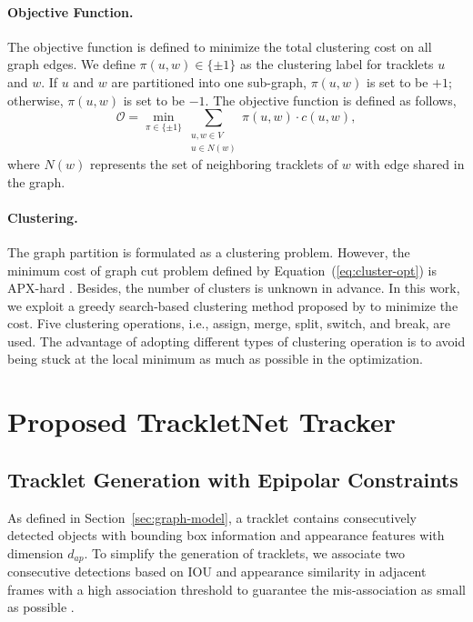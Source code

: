 \documentclass[10pt,twocolumn,letterpaper]{article}
\begin{document}
\paragraph{Objective Function.} 
The objective function is defined to minimize the total clustering cost on all graph edges. We define $\pi(u,w)\in\{\pm 1\}$ as the clustering label for tracklets $u$ and $w$. If $u$ and $w$ are partitioned into one sub-graph, $\pi(u,w)$ is set to be $+1$; otherwise, $\pi(u,w)$ is set to be $-1$. The objective function is defined as follows,
\begin{equation}
\mathcal{O} = \min_{\pi \in \{\pm 1\}}\sum_{\substack{u,w \in V\\u \in N(w)}} \pi(u,w) \cdot c(u,w),
\label{eq:cluster-opt}
\end{equation}
where $N(w)$ represents the set of neighboring tracklets of $w$ with edge shared in the graph.

\paragraph{Clustering.} 
The graph partition is formulated as a clustering problem. However, the minimum cost of graph cut problem defined by Equation~(\ref{eq:cluster-opt}) is APX-hard \cite{papadimitriou1991optimization}. 
Besides, the number of clusters is unknown in advance. 
In this work, we exploit a greedy search-based clustering method proposed by \cite{tang2018single} to minimize the cost. Five clustering operations, i.e., assign, merge, split, switch, and break, are used. The advantage of adopting different types of clustering operation is to avoid being stuck at the local minimum as much as possible in the optimization. 


\section{Proposed TrackletNet Tracker} 


\subsection{Tracklet Generation with Epipolar Constraints}
\label{sec:epi-constri}

As defined in Section~\ref{sec:graph-model}, a tracklet contains consecutively detected objects with bounding box information and appearance features with dimension $d_{ap}$. To simplify the generation of tracklets, we associate two consecutive detections based on IOU and appearance similarity in adjacent frames with a high association threshold to guarantee the mis-association as small as possible \cite{zhang2017multi,wang2016closed}. 
\end{document}
